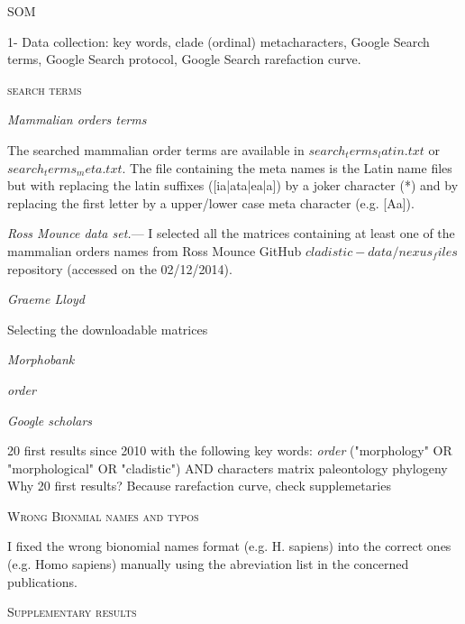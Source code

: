 \documentclass[12pt,letterpaper]{article}
\renewcommand{\section}[1]{%
\bigskip
\begin{center}
\begin{Large}
\normalfont\scshape #1
\medskip
\end{Large}
\end{center}}
\renewcommand{\subsection}[1]{%
\bigskip
\begin{center}
\begin{large}
\normalfont\itshape #1
\end{large}
\end{center}}
\renewcommand{\subsubsection}[1]{%
\vspace{2ex}
\noindent
\textit{#1.}---}
\begin{document}




\section{SOM}
1- Data collection: key words, clade (ordinal) metacharacters, Google Search terms, Google Search protocol, Google Search rarefaction curve.

\section{search terms}

\subsection{Mammalian orders terms}
The searched mammalian order terms are available in $search_terms_latin.txt$ or $search_terms_meta.txt$. The file containing the meta names is the Latin name files but with replacing the latin suffixes ([ia|ata|ea|a]) by a joker character (*) and by replacing the first letter by a upper/lower case meta character (e.g. [Aa]).

\subsubsection{Ross Mounce data set}
I selected all the matrices containing at least one of the mammalian orders names from Ross Mounce GitHub $cladistic-data/nexus_files$ repository (accessed on the 02/12/2014).

\subsection{Graeme Lloyd}
Selecting the downloadable matrices

\subsection{Morphobank}
\textit{order}

\subsection{Google scholars}
20 first results since 2010 with the following key words:
\textit{order} ("morphology" OR "morphological" OR "cladistic") AND characters matrix paleontology phylogeny
Why 20 first results? Because rarefaction curve, check supplemetaries

\section{Wrong Bionmial names and typos}
I fixed the wrong bionomial names format (e.g. H. sapiens) into the correct ones (e.g. Homo sapiens) manually using the abreviation list in the concerned publications.


\section{Supplementary results}


\end{document}
